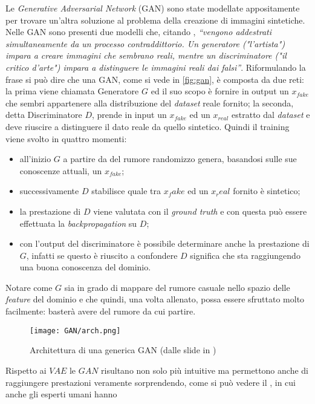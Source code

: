 Le \emph{Generative Adversarial Network} (GAN) sono state modellate appositamente per trovare un'altra soluzione al problema della creazione di immagini sintetiche.
Nelle GAN sono presenti due modelli che, citando \cite{GANTF}, \emph{``vengono addestrati simultaneamente da un processo contraddittorio. Un generatore ("l'artista") impara a creare immagini che sembrano reali, mentre un discriminatore ("il critico d'arte") impara a distinguere le immagini reali dai falsi''}.
Riformulando la frase si può dire che una GAN, come si vede in \autoref{fig:gan}, è composta da due reti: la prima viene chiamata Generatore $G$ ed il suo scopo è fornire in output un $x_{fake}$ che sembri appartenere alla distribuzione del \emph{dataset} reale fornito; la seconda, detta Discriminatore $D$, prende in input un $x_{fake}$ ed un $x_{real}$ estratto dal \emph{dataset} e deve riuscire a distinguere il dato reale da quello sintetico.
Quindi il training viene svolto in quattro momenti:
\begin{itemize}
  \item all'inizio $G$ a partire da del rumore randomizzo genera, basandosi sulle sue conoscenze attuali, un $x_{fake}$;
  \item successivamente $D$ stabilisce quale tra $x_fake$ ed un $x_real$ fornito è sintetico;
  \item la prestazione di $D$ viene valutata con il \emph{ground truth} e con questa può essere effettuata la \emph{backpropagation} su $D$;
  \item con l'output del discriminatore è possibile determinare anche la prestazione di $G$, infatti se questo è riuscito a confondere $D$ significa che sta raggiungendo una buona conoscenza del dominio.
\end{itemize}
Notare come $G$ sia in grado di mappare del rumore casuale nello spazio delle \emph{feature} del dominio e che quindi, una volta allenato, possa essere sfruttato molto facilmente: basterà avere del rumore da cui partire.
\begin{figure}[ht]
  \centering
  \texttt{[image: GAN/arch.png]}
  \caption{Architettura di una generica GAN (dalle slide in \cite{MIT_GEN})}
  \label{fig:gan}
\end{figure}
Rispetto ai $VAE$ le $GAN$ risultano non solo più intuitive ma permettono anche di raggiungere prestazioni veramente sorprendendo, come si può vedere il , in cui anche gli esperti umani hanno 







